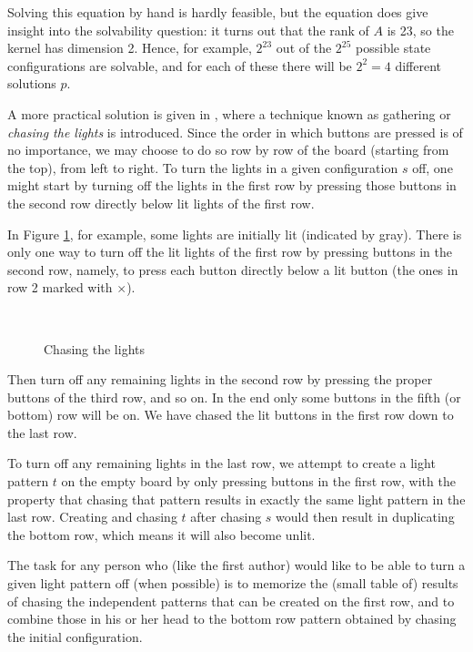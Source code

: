 Solving this equation by hand is hardly feasible, but the equation does give
insight into the solvability question: it turns out that the rank
of $A$ is 23, so the kernel has dimension 2. Hence, for example,
$2^{23}$ out of the $2^{25}$ possible state configurations are solvable,
and for each of these there will be $2^2=4$ different solutions $p$.

A more practical solution is given in \cite{martin01}, where a technique
known as gathering or \emph{chasing the lights} is introduced.
Since the order in which buttons are pressed is of no importance,
we may choose to do so row by row of the board (starting from the top), from
left to right. To turn the lights in a given configuration $s$ off,
one might start by turning off the lights in the first row by
pressing those buttons in the second row directly below lit lights
of the first row. 

In Figure \ref{chasing}, for example, some lights are initially
lit (indicated by gray).  There is only one way to turn off the
lit lights of the first row by pressing buttons
in the second row,
namely, to press each button directly below
a lit button (the ones in row 2 marked with $\times$).

\begin{figure}
  \mbox{
  }
  \caption{Chasing the lights}
  \label{chasing}
\end{figure}

Then turn off any remaining lights in the second
row by pressing the proper buttons of the third row, and so on. 
In the end only some buttons in the fifth (or bottom) row will
be on. We have chased the lit buttons in the first row down to the
last row.


To turn off any remaining lights in the last row, we attempt to
create a light pattern $t$ on the empty board by only pressing buttons
in the first row, with the property that chasing that pattern results
in exactly the same light pattern in the last row. Creating and chasing
$t$  after chasing $s$ would then result in duplicating the bottom
row, which means it will also become unlit.

The task for any person who (like the first author) would
like to be able to turn a given light pattern off (when
possible) is to memorize the (small table of) results of chasing the independent
patterns that can be created on the first row, and to combine those
in his or her head to the bottom row pattern obtained by chasing
the initial configuration.

